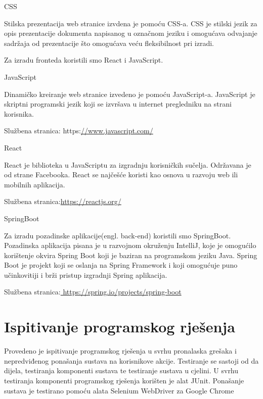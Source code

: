 CSS

Stilska prezentacija web stranice izvdena je pomoću CSS-a.
CSS je stilski jezik za opis prezentacije dokumenta napisanog u označnom jeziku i omogućava odvajanje sadržaja od prezentacije što omogućava veću fleksibilnost pri izradi. 

\vspace{8mm}
Za izradu fronteda koristili smo React i JavaScript. 
\vspace{4mm}

JavaScript

Dinamičko kreiranje web stranice izvedeno je pomoću JavaScript-a. JavaScript je skriptni programski jezik koji se izvršava u internet pregledniku
na strani korisnika.

Službena stranica: https:\url{//www.javascript.com/}
\vspace{3mm}

React

React je biblioteka u JavaScriptu za izgradnju korisničkih sučelja. Održavana je od strane Facebooka. 
React se najčešće koristi kao osnova u razvoju web ili mobilnih aplikacija. 

Službena stranica:\url{https://reactjs.org/}
\vspace{3mm}

SpringBoot

Za izradu pozadinske aplikacije(engl. back-end) koristili smo SpringBoot. Pozadinska aplikacija pisana je u razvojnom okruženju IntelliJ, koje je
omogućilo korištenje okvira Spring Boot koji je baziran na programskom jeziku Java. Spring Boot je projekt koji se oslanja na Spring Framework i koji omogućuje puno učinkovitiji i brži pristup izgradnji Spring aplikacija.

Službena stranica:\url{ https://spring.io/projects/spring-boot}
\vspace{5mm}

			
			
			\eject 
		
	
		\section{Ispitivanje programskog rješenja}
			
		Provedeno je ispitivanje programskog rješenja u svrhu pronalaska grešaka i nepredviđenog ponašanja sustava na korisnikove akcije. Testiranje se sastoji od da dijela, testiranja komponenti sustava te testiranje sustava u cjelini. U svrhu testiranja komponenti programskog rješenja korišten je alat JUnit. Ponašanje sustava je testirano pomoću alata Selenium WebDriver za Google Chrome
			
